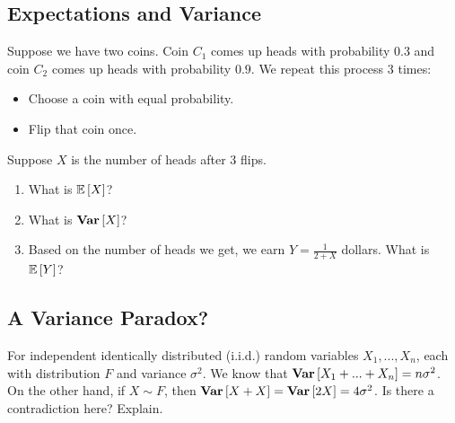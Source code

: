 \subsection{Expectations and Variance}

Suppose we have two coins. Coin $C_1$ comes up heads with probability $0.3$ and coin $C_2$ comes up heads with probability $0.9$. We repeat this process 3 times:
\begin{itemize}
    \item Choose a coin with equal probability. 
    \item Flip that coin once. 
\end{itemize}

Suppose $X$ is the number of heads after 3 flips.
\begin{enumerate}
    \item What is $\mathbb{E}\left[ X \right]$?
    \item What is $\textbf{Var}\left[ X \right]$?
    \item Based on the number of heads we get, we earn $Y = \frac{1}{2 + X}$ dollars. 
    What is $\mathbb{E}\left[ Y \right]$?
\end{enumerate}


\subsection{A Variance Paradox?}

For independent identically distributed (i.i.d.) random variables $X_1, ..., X_n$, each with distribution $F$ and variance $\sigma^2$.
We know that $\textbf{Var}\left[ X_1 + ... + X_n \right] = n\sigma^2$. 
On the other hand, if $X \sim F$, then $\textbf{Var}\left[ X + X \right] = \textbf{Var}\left[ 2X \right] = 4 \sigma^2$. Is there a contradiction here? Explain. 

